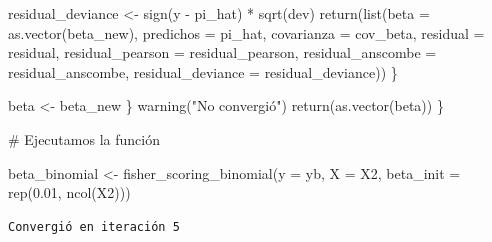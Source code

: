 \documentclass[
  letterpaper,
  DIV=11,
  numbers=noendperiod]{scrartcl}
\newenvironment{Shaded}{\begin{snugshade}}{\end{snugshade}}
\newcommand{\AttributeTok}[1]{\textcolor[rgb]{0.40,0.45,0.13}{#1}}
\newcommand{\CommentTok}[1]{\textcolor[rgb]{0.37,0.37,0.37}{#1}}
\newcommand{\FloatTok}[1]{\textcolor[rgb]{0.68,0.00,0.00}{#1}}
\newcommand{\FunctionTok}[1]{\textcolor[rgb]{0.28,0.35,0.67}{#1}}
\newcommand{\NormalTok}[1]{\textcolor[rgb]{0.00,0.23,0.31}{#1}}
\newcommand{\OtherTok}[1]{\textcolor[rgb]{0.00,0.23,0.31}{#1}}
\newcommand{\SpecialCharTok}[1]{\textcolor[rgb]{0.37,0.37,0.37}{#1}}
\newcommand{\StringTok}[1]{\textcolor[rgb]{0.13,0.47,0.30}{#1}}
\begin{document}
\begin{Shaded}
\begin{Highlighting}[]
\NormalTok{      residual\_deviance }\OtherTok{\textless{}{-}} \FunctionTok{sign}\NormalTok{(y }\SpecialCharTok{{-}}\NormalTok{ pi\_hat) }\SpecialCharTok{*} \FunctionTok{sqrt}\NormalTok{(dev)}
      \FunctionTok{return}\NormalTok{(}\FunctionTok{list}\NormalTok{(}\AttributeTok{beta =} \FunctionTok{as.vector}\NormalTok{(beta\_new), }\AttributeTok{predichos =}\NormalTok{ pi\_hat,}
                  \AttributeTok{covarianza =}\NormalTok{ cov\_beta,}
                  \AttributeTok{residual =}\NormalTok{ residual,}
                  \AttributeTok{residual\_pearson =}\NormalTok{ residual\_pearson,}
                  \AttributeTok{residual\_anscombe =}\NormalTok{ residual\_anscombe,}
                  \AttributeTok{residual\_deviance =}\NormalTok{ residual\_deviance))}
\NormalTok{    \}}
    
\NormalTok{    beta }\OtherTok{\textless{}{-}}\NormalTok{ beta\_new}
\NormalTok{  \}}
  \FunctionTok{warning}\NormalTok{(}\StringTok{"No convergió"}\NormalTok{)}
  \FunctionTok{return}\NormalTok{(}\FunctionTok{as.vector}\NormalTok{(beta))}
\NormalTok{\}}
\end{Highlighting}
\end{Shaded}

\begin{Shaded}
\begin{Highlighting}[]
\CommentTok{\# Ejecutamos la función}

\NormalTok{beta\_binomial }\OtherTok{\textless{}{-}} \FunctionTok{fisher\_scoring\_binomial}\NormalTok{(}\AttributeTok{y =}\NormalTok{ yb, }\AttributeTok{X =}\NormalTok{ X2, }
                                         \AttributeTok{beta\_init =} \FunctionTok{rep}\NormalTok{(}\FloatTok{0.01}\NormalTok{, }\FunctionTok{ncol}\NormalTok{(X2)))}
\end{Highlighting}
\end{Shaded}

\begin{verbatim}
Convergió en iteración 5
\end{verbatim}

\begin{Shaded}
\end{Shaded}
\end{document}
